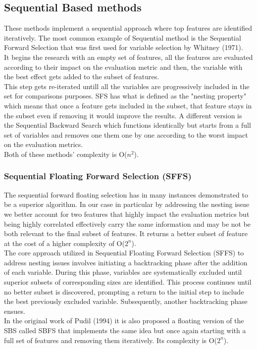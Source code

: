 \documentclass{Configuration_Files/PoliMi3i_thesis}
\begin{document}
\subsection{Sequential Based methods}

These methods implement a sequential approach where top features are identified iteratively.
The most common example of Sequential method is the Sequential Forward Selection that was first used for variable selection by Whitney (1971). \\
It begins the research with an empty set of features, all the features are evaluated according to their impact on the evaluation metric and then, the variable with the best effect gets added to the subset of features. \\
This step gets re-iterated untill all the variables are progressively included in the set for comparisons purposes.
SFS has what is defined as the "nesting property" which means that once a feature gets included in the subset, that feature stays in the subset even if removing it would improve the results.  \cite{reunanenOverfittingMakingComparisons}
A different version is the Sequential Backward Search which functions identically but starts from a full set of variables and removes one them one by one according to the worst impact on the evaluation metrics. \cite{pudilFloatingSearchMethods1994} \\
Both of these methods' complexity is O($n^2$). \cite{kudoComparisonAlgorithmsThat2000}

\subsubsection{Sequential Floating Forward Selection (SFFS)}

The sequential forward floating selection has in many instances demonstrated to be a superior algorithm.\cite{reunanenOverfittingMakingComparisons} \cite{zongkerAlgorithmsFeatureSelection1996}
In our case in particular by addressing the nesting issue we better account for two features that highly impact the evaluation metrics but being highly correlated effectively carry the same information and may be not be both relevant to the final subset of features.
It returns a better subset of feature at the cost of a higher complexity of O($2^n$). \cite{kudoComparisonAlgorithmsThat2000} \\
The core approach utilized in Sequential Floating Forward Selection (SFFS) to address nesting issues involves initiating a backtracking phase after the addition of each variable. During this phase, variables are systematically excluded until superior subsets of corresponding sizes are identified. This process continues until no better subset is discovered, prompting a return to the initial step to include the best previously excluded variable. Subsequently, another backtracking phase ensues. \cite{reunanenOverfittingMakingComparisons} \cite{ pudilFloatingSearchMethods1994} \\ 
In the original work of Pudil (1994) it is also proposed a floating version of the SBS called SBFS that implements the same idea but once again starting with a full set of features and removing them iteratively. Its complexity is O($2^n$).
\end{document}
